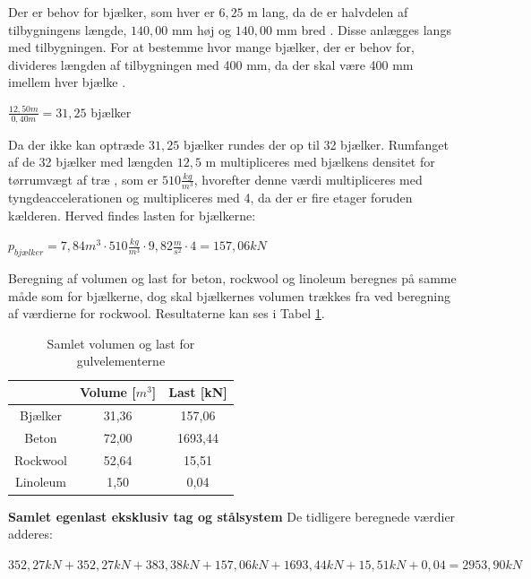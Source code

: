 Der er behov for bjælker, som hver er $6,\!25$ m lang, da de er halvdelen af tilbygningens længde, $140,\!00$ mm høj og $140,\!00$ mm bred \citep{granse}. Disse anlægges langs med tilbygningen. For at bestemme hvor mange bjælker, der er behov for, divideres længden af tilbygningen med 400 mm, da der skal være 400 mm imellem hver bjælke \citep{Gulvopbygning}. 

\begin{center}
	$\frac{12,\!50 m}{0,\!40 m}=31,\!25$ bjælker
\end{center} 

Da der ikke kan optræde $31,\!25$ bjælker rundes der op til 32 bjælker.
\newline
\newline
Rumfanget af de 32 bjælker med længden $12,\!5$ m multipliceres med bjælkens densitet for tørrumvægt af træ \citep{torrumvagt}, som er $510 \frac{kg}{m^3}$, hvorefter denne værdi multipliceres med tyngdeaccelerationen og multipliceres med 4, da der er fire etager foruden kælderen. Herved findes lasten for bjælkerne: 
\begin{center}
	$p_{bjælker} = 7,\!84 m^3\cdot 510 \frac{kg}{m^3}\cdot 9,\!82 \frac{m}{s^2}\cdot 4 = 157,\!06 kN$
\end{center}

Beregning af volumen og last for beton, rockwool og linoleum beregnes på samme måde som for bjælkerne, dog skal bjælkernes volumen trækkes fra ved beregning af værdierne for rockwool. Resultaterne kan ses i Tabel \ref{tab:gulv}.

\begin{table}
	\begin{center}
		\begin{tabular}{|c|c|c|}
			\hline
			& Volume [$m^3$] & Last [kN] \\ \hline
			Bjælker	 & 31,36 & 157,06	\\ \hline
			Beton    & 72,00 & 1693,44     \\ \hline
			Rockwool & 52,64 & 15,51     \\ \hline
			Linoleum & 1,50 & 0,04     \\ \hline
		\end{tabular}
		\caption{Samlet volumen og last for gulvelementerne}
		\label{tab:gulv}
	\end{center}
\end{table}

\textbf{Samlet egenlast eksklusiv tag og stålsystem}
\newline
De tidligere beregnede værdier adderes:
\begin{center}
	$352,\!27 kN + 352,\!27 kN + 383,\!38 kN + 157,\!06 kN + 1693,\!44 kN + 15,\!51 kN + 0,\!04 = 2953,\!90 kN$
\end{center}

